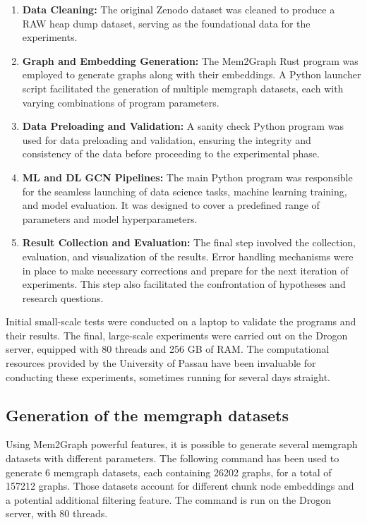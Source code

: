 \begin{enumerate}
    \item \textbf{Data Cleaning:} The original Zenodo dataset was cleaned to produce a RAW heap dump dataset, serving as the foundational data for the experiments.
    
    \item \textbf{Graph and Embedding Generation:} The Mem2Graph Rust program was employed to generate graphs along with their embeddings. A Python launcher script facilitated the generation of multiple memgraph datasets, each with varying combinations of program parameters.
    
    \item \textbf{Data Preloading and Validation:} A sanity check Python program was used for data preloading and validation, ensuring the integrity and consistency of the data before proceeding to the experimental phase.
    
    \item \textbf{ML and DL GCN Pipelines:} The main Python program was responsible for the seamless launching of data science tasks, machine learning training, and model evaluation. It was designed to cover a predefined range of parameters and model hyperparameters.
    
    \item \textbf{Result Collection and Evaluation:} The final step involved the collection, evaluation, and visualization of the results. Error handling mechanisms were in place to make necessary corrections and prepare for the next iteration of experiments. This step also facilitated the confrontation of hypotheses and research questions.
\end{enumerate}

Initial small-scale tests were conducted on a laptop to validate the programs and their results. The final, large-scale experiments were carried out on the Drogon server, equipped with 80 threads and 256 GB of RAM. The computational resources provided by the University of Passau have been invaluable for conducting these experiments, sometimes running for several days straight.

\subsection{Generation of the memgraph datasets}
Using Mem2Graph powerful features, it is possible to generate several memgraph datasets with different parameters. The following command has been used to generate 6 memgraph datasets, each containing 26202 graphs, for a total of 157212 graphs. Those datasets account for different chunk node embeddings and a potential additional filtering feature. The command is run on the Drogon server, with 80 threads.

